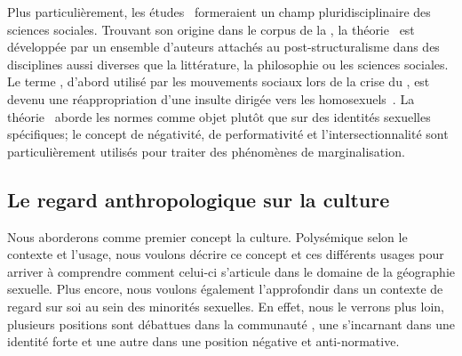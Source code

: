 Plus particulièrement, les études \qus\ formeraient un champ pluridisciplinaire des sciences sociales. 
Trouvant son origine dans le corpus de la , la théorie \qu\ est développée par un ensemble d'auteurs attachés au post-structuralisme dans des disciplines aussi diverses que la littérature, la philosophie ou les sciences sociales. 
Le terme \qu, d'abord utilisé par les mouvements sociaux \lgbt{} lors de la crise du \sida, est devenu une réappropriation d'une insulte dirigée vers les homosexuels~\citep{Laprade2014}.
La théorie \qu\ aborde les normes  comme objet plutôt que sur des identités sexuelles spécifiques; le concept de négativité, de performativité et l'intersectionnalité sont particulièrement utilisés pour traiter des phénomènes de marginalisation.

\subsection{Le regard anthropologique sur la culture}
\label{subsec:le_regard_anthropologique_sur_la_culture} 
Nous aborderons comme premier concept la culture.
Polysémique selon le contexte et l'usage, nous voulons décrire ce concept et ces différents usages pour arriver à comprendre comment celui-ci s'articule dans le domaine de la géographie sexuelle.
Plus encore, nous voulons également l'approfondir dans un contexte de regard sur soi au sein des minorités sexuelles. 
En effet, nous le verrons plus loin, plusieurs positions sont débattues dans la communauté \lgbt{}, une s'incarnant dans une identité forte et une autre dans une position négative et anti-normative.


